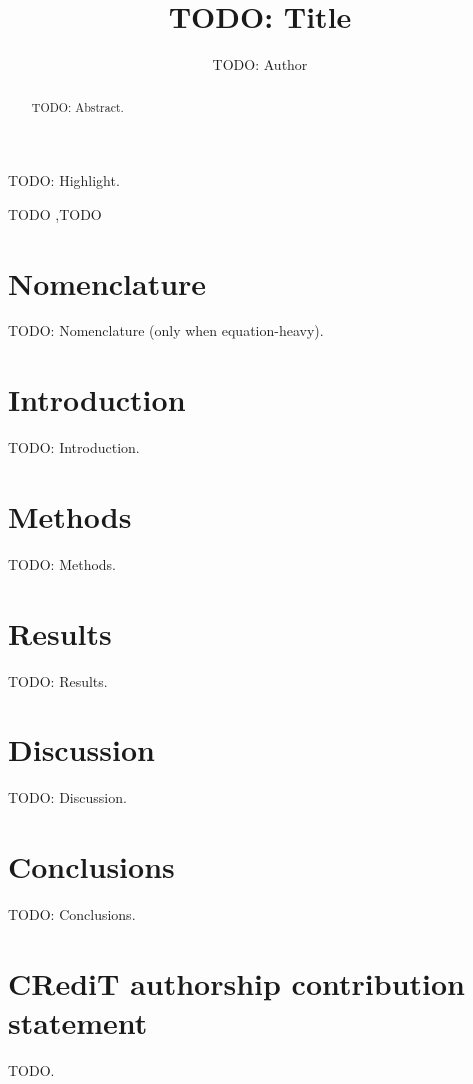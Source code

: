 \documentclass[preprint,12pt]{elsarticle}
\begin{document}
\begin{frontmatter}

\title{TODO: Title}

\author[a]{TODO: Author}

\begin{abstract}
TODO: Abstract.
\end{abstract}

\begin{highlights}
\item TODO: Highlight.
\end{highlights}

\begin{keyword}
TODO \sep TODO
\end{keyword}

\end{frontmatter}

\section*{Nomenclature}
TODO: Nomenclature (only when equation-heavy).

\section{Introduction}
TODO: Introduction.

\section{Methods}
TODO: Methods.

\section{Results}
TODO: Results.

\section{Discussion}
TODO: Discussion.

\section{Conclusions}
TODO: Conclusions.

\section*{CRediT authorship contribution statement}
TODO.
\end{document}
